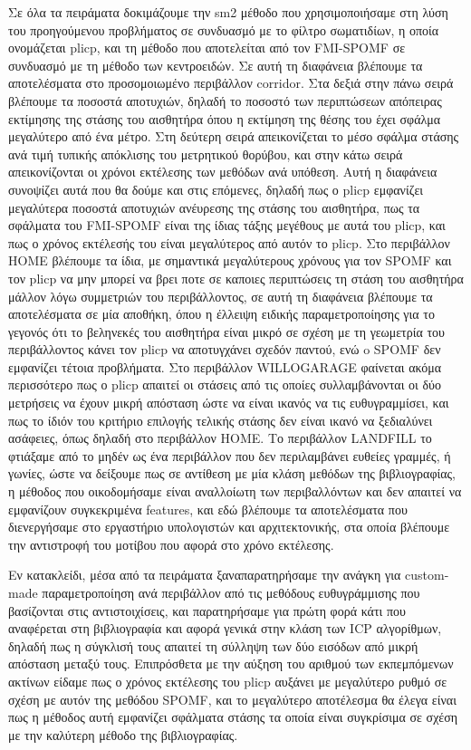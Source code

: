 \documentclass[a4paper,10pt]{article}
\begin{document}
Σε όλα τα πειράματα δοκιμάζουμε την sm2  μέθοδο που χρησιμοποιήσαμε στη λύση
του προηγούμενου προβλήματος σε συνδυασμό με το φίλτρο σωματιδίων, η οποία
ονομάζεται plicp, και τη μέθοδο που αποτελείται από τον FMI-SPOMF σε συνδυασμό
με τη μέθοδο των κεντροειδών. Σε αυτή τη διαφάνεια βλέπουμε τα αποτελέσματα στο
προσομοιωμένο περιβάλλον corridor. Στα δεξιά στην πάνω σειρά βλέπουμε τα
ποσοστά αποτυχιών, δηλαδή το ποσοστό των περιπτώσεων απόπειρας εκτίμησης της
στάσης του αισθητήρα όπου η εκτίμηση της θέσης του έχει σφάλμα μεγαλύτερο από
ένα μέτρο. Στη δεύτερη σειρά απεικονίζεται το μέσο σφάλμα στάσης ανά τιμή
τυπικής απόκλισης του μετρητικού θορύβου, και στην κάτω σειρά απεικονίζονται οι
χρόνοι εκτέλεσης των μεθόδων ανά υπόθεση. Αυτή η διαφάνεια συνοψίζει αυτά που
θα δούμε και στις επόμενες, δηλαδή πως ο plicp εμφανίζει μεγαλύτερα ποσοστά
αποτυχιών ανέυρεσης της στάσης του αισθητήρα, πως τα σφάλματα του FMI-SPOMF
είναι της ίδιας τάξης μεγέθους με αυτά του plicp, και πως ο χρόνος εκτέλεσής
του είναι μεγαλύτερος από αυτόν το plicp. Στο περιβάλλον HOME βλέπουμε τα ίδια,
με σημαντικά μεγαλύτερους χρόνους για τον SPOMF και τον plicp να μην μπορεί να
βρει ποτε σε καποιες περιπτώσεις τη στάση του αισθητήρα μάλλον λόγω συμμετριών
του περιβάλλοντος, σε αυτή τη διαφάνεια βλέπουμε τα αποτελέσματα σε μία
αποθήκη, όπου  η έλλειψη ειδικής παραμετροποίησης για το γεγονός ότι το
βεληνεκές του αισθητήρα είναι μικρό σε σχέση με τη γεωμετρία του περιβάλλοντος
κάνει τον plicp να αποτυγχάνει σχεδόν παντού, ενώ o SPOMF δεν εμφανίζει τέτοια
προβλήματα. Στο περιβάλλον WILLOGARAGE φαίνεται ακόμα περισσότερο πως ο plicp
απαιτεί οι στάσεις από τις οποίες συλλαμβάνονται οι δύο μετρήσεις να έχουν
μικρή απόσταση ώστε να είναι ικανός να τις ευθυγραμμίσει, και πως το ίδιόν του
κριτήριο επιλογής τελικής στάσης δεν είναι ικανό να ξεδιαλύνει ασάφειες, όπως
δηλαδή στο περιβάλλον HOME. Το περιβάλλον LANDFILL το φτιάξαμε από το μηδέν ως
ένα περιβάλλον που δεν περιλαμβάνει ευθείες γραμμές, ή γωνίες, ώστε να δείξουμε
πως σε αντίθεση με μία κλάση μεθόδων της βιβλιογραφίας, η μέθοδος που
οικοδομήσαμε είναι αναλλοίωτη των περιβαλλόντων και δεν απαιτεί να εμφανίζουν
συγκεκριμένα features, και εδώ βλέπουμε τα αποτελέσματα που διενεργήσαμε στο
εργαστήριο υπολογιστών και αρχιτεκτονικής, στα οποία βλέπουμε την αντιστροφή
του μοτίβου που αφορά στο χρόνο εκτέλεσης.


Εν κατακλείδι, μέσα από τα πειράματα ξαναπαρατηρήσαμε την ανάγκη για
custom-made παραμετροποίηση ανά περιβάλλον από τις μεθόδους ευθυγράμμισης που
βασίζονται στις αντιστοιχίσεις, και παρατηρήσαμε για πρώτη φορά κάτι που
αναφέρεται στη βιβλιογραφία και αφορά γενικά στην κλάση των ICP αλγορίθμων,
δηλαδή πως η σύγκλισή τους απαιτεί τη σύλληψη των δύο εισόδων από μικρή
απόσταση μεταξύ τους. Επιπρόσθετα με την αύξηση του αριθμού των εκπεμπόμενων
ακτίνων είδαμε πως ο χρόνος εκτέλεσης του plicp αυξάνει με μεγαλύτερο ρυθμό
σε σχέση με αυτόν της μεθόδου SPOMF, και το μεγαλύτερο αποτέλεσμα θα έλεγα
είναι πως η μέθοδος αυτή εμφανίζει σφάλματα στάσης τα οποία είναι συγκρίσιμα
σε σχέση με την καλύτερη μέθοδο της βιβλιογραφίας.
\end{document}

